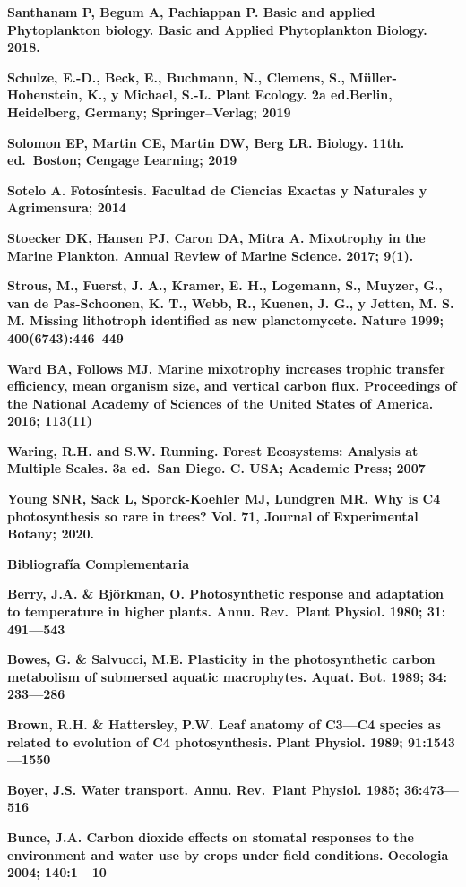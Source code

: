 \documentclass[
]{article}
\begin{document}
\textbf{Santhanam P, Begum A, Pachiappan P. Basic and applied
Phytoplankton biology. Basic and Applied Phytoplankton Biology. 2018.}

\textbf{Schulze, E.-D., Beck, E., Buchmann, N., Clemens, S.,
Müller-Hohenstein, K., y Michael, S.-L. Plant Ecology. 2a ed.Berlin,
Heidelberg, Germany; Springer--Verlag; 2019}

\textbf{Solomon EP, Martin CE, Martin DW, Berg LR. Biology. 11th.
ed.~Boston; Cengage Learning; 2019}

\textbf{Sotelo A. Fotosíntesis. Facultad de Ciencias Exactas y Naturales
y Agrimensura; 2014}

\textbf{Stoecker DK, Hansen PJ, Caron DA, Mitra A. Mixotrophy in the
Marine Plankton. Annual Review of Marine Science. 2017; 9(1).}

\textbf{Strous, M., Fuerst, J. A., Kramer, E. H., Logemann, S., Muyzer,
G., van de Pas-Schoonen, K. T., Webb, R., Kuenen, J. G., y Jetten, M. S.
M. Missing lithotroph identified as new planctomycete. Nature 1999;
400(6743):446--449}

\textbf{Ward BA, Follows MJ. Marine mixotrophy increases trophic
transfer efficiency, mean organism size, and vertical carbon flux.
Proceedings of the National Academy of Sciences of the United States of
America. 2016; 113(11)}

\textbf{Waring, R.H. and S.W. Running. Forest Ecosystems: Analysis at
Multiple Scales. 3a ed.~San Diego. C. USA; Academic Press; 2007}

\textbf{Young SNR, Sack L, Sporck-Koehler MJ, Lundgren MR. Why is C4
photosynthesis so rare in trees? Vol. 71, Journal of Experimental
Botany; 2020.}

\textbf{Bibliografía Complementaria}

\textbf{Berry, J.A. \& Björkman, O. Photosynthetic response and
adaptation to temperature in higher plants. Annu. Rev.~Plant Physiol.
1980; 31: 491---543}

\textbf{Bowes, G. \& Salvucci, M.E. Plasticity in the photosynthetic
carbon metabolism of submersed aquatic macrophytes. Aquat. Bot. 1989;
34: 233---286}

\textbf{Brown, R.H. \& Hattersley, P.W. Leaf anatomy of C3---C4 species
as related to evolution of C4 photosynthesis. Plant Physiol. 1989;
91:1543---1550}

\textbf{Boyer, J.S. Water transport. Annu. Rev.~Plant Physiol. 1985;
36:473---516}

\textbf{Bunce, J.A. Carbon dioxide effects on stomatal responses to the
environment and water use by crops under field conditions. Oecologia
2004; 140:1---10}
\end{document}
